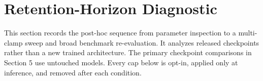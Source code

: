 \begin{table}[!ht]
\centering
\small
\setlength{\tabcolsep}{4pt}
\caption{Recorded systems-scale throughput for ATMA's 9.2B stress shape and vLLM 0.25.0 serving Qwen3.5-9B on one L40S (BF16, greedy sampling). Ratio is ATMA/vLLM.}
\label{table:vllm_comparison_matrix}
\end{table}

\section{Retention-Horizon Diagnostic}
\label{appendix:retention_audit}

This section records the post-hoc sequence from parameter inspection to a multi-clamp sweep and broad benchmark re-evaluation. It analyzes released checkpoints rather than a new trained architecture. The primary checkpoint comparisons in Section 5 use untouched models. Every cap below is opt-in, applied only at inference, and removed after each condition.

